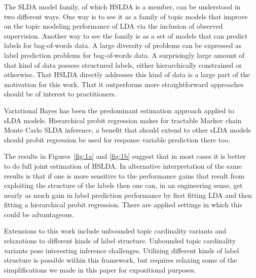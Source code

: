 
The SLDA model family, of which HSLDA is a member, can be understood in two different ways.  One way is to see it as a family of topic models that improve on the topic modeling performance of LDA via the inclusion of observed supervision.  Another way to see the family is as a set of models that can predict labels for bag-of-words data.  A large diversity of problems can be expressed as label prediction problems for bag-of-words data.  A surprisingly large amount of that kind of data possess structured labels, either hierarchically constrained or otherwise.  That HSLDA directly addresses this kind of data is a large part of the motivation for this work.   That it outperforms more straightforward approaches should be of interest to practitioners.

Variational Bayes has been the predominant estimation approach applied to sLDA models.  Hierarchical probit regression makes for tractable Markov chain Monte Carlo SLDA inference, a benefit that should extend to other sLDA models should probit regression be used for response variable prediction there too.  

The results in Figures~\ref{fig:1a} and \ref{fig:1b} suggest that in most cases it is better to do full joint estimation of HSLDA.  In alternative interpretation of the same results is that if one is more sensitive to the performance gains that result from exploiting the structure of the labels then one can, in an engineering sense, get nearly as much gain in label prediction performance by first fitting LDA and then fitting a hierarchical probit regression.  There are applied settings in which this could be advantageous.

Extensions to this work include unbounded topic cardinality variants and relaxations to different kinds of label structure.  Unbounded topic cardinality variants pose interesting inference challenges.  Utilizing different kinds of label structure is possible within this framework, but requires relaxing some of the simplifications we made in this paper for expositional purposes. 

